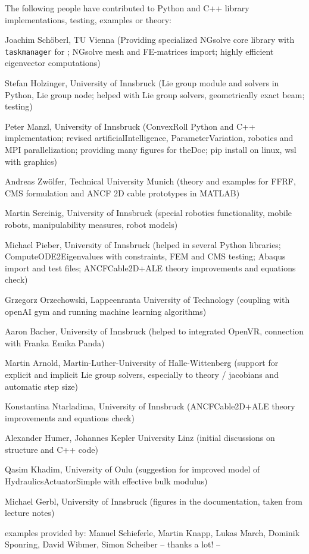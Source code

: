 The following people have contributed to Python and C++ library implementations, testing, examples or theory:
\bi
  \item Joachim Sch{\"o}berl, TU Vienna (Providing specialized NGsolve \cite{Schoeberl1997,NGsolve2014,NGsolve2022} core library with \texttt{taskmanager} for ; NGsolve mesh and FE-matrices import; highly efficient eigenvector computations)
  \item Stefan Holzinger, University of Innsbruck (Lie group module and solvers in Python, Lie group node; helped with Lie group solvers, geometrically exact beam; testing)
  \item Peter Manzl, University of Innsbruck (ConvexRoll Python and C++ implementation; revised artificialIntelligence, ParameterVariation, robotics and MPI parallelization; providing many figures for theDoc; pip install on linux, wsl with graphics)
  \item Andreas Zw{\"o}lfer, Technical University Munich (theory and examples for FFRF, CMS formulation and ANCF 2D cable prototypes in MATLAB)
  \item Martin Sereinig, University of Innsbruck (special robotics functionality, mobile robots, manipulability measures, robot models)
  \item Michael Pieber, University of Innsbruck (helped in several Python libraries; ComputeODE2Eigenvalues with constraints, FEM and CMS testing; Abaqus import and test files; ANCFCable2D+ALE theory improvements and equations check)
  \item Grzegorz Orzechowski, Lappeenranta University of Technology (coupling with openAI gym and running machine learning algorithms)
  \item Aaron Bacher, University of Innsbruck (helped to integrated OpenVR, connection with Franka Emika Panda)
  \item Martin Arnold, Martin-Luther-University of Halle-Wittenberg (support for explicit and implicit Lie group solvers, especially to theory / jacobians and automatic step size)
  \item Konstantina Ntarladima, University of Innsbruck (ANCFCable2D+ALE theory improvements and equations check)
  \item Alexander Humer, Johannes Kepler University Linz (initial discussions on structure and C++ code)
  \item Qasim Khadim, University of Oulu (suggestion for improved model of HydraulicsActuatorSimple with effective bulk modulus)
  \item Michael Gerbl, University of Innsbruck (figures in the documentation, taken from lecture notes)
  \item examples provided by: Manuel Schieferle, Martin Knapp, Lukas March, Dominik Sponring, David Wibmer, Simon Scheiber
\ei
-- thanks a lot! --
%
\newpage
{}
%

